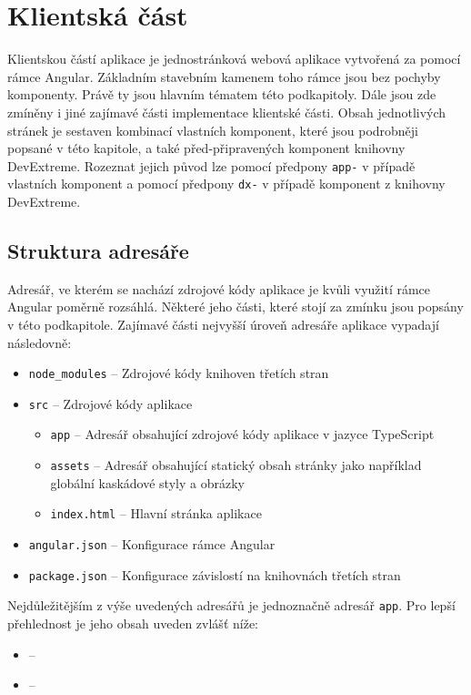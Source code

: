 \section{Klientská část}
Klientskou částí aplikace je jednostránková webová aplikace vytvořená za pomocí rámce Angular. Základním stavebním kamenem toho rámce jsou bez pochyby komponenty. Právě ty jsou hlavním tématem této podkapitoly. Dále jsou zde zmíněny i jiné zajímavé části implementace klientské části. Obsah jednotlivých stránek je sestaven kombinací vlastních komponent, které jsou podrobněji popsané v této kapitole, a také před-připravených komponent knihovny DevExtreme. Rozeznat jejich původ lze pomocí předpony \texttt{app-} v případě vlastních komponent a pomocí předpony \texttt{dx-} v případě komponent z knihovny DevExtreme.


\subsection{Struktura adresáře}
Adresář, ve kterém se nachází zdrojové kódy aplikace je kvůli využití rámce Angular poměrně rozsáhlá. Některé jeho části, které stojí za zmínku jsou popsány v této podkapitole. Zajímavé části nejvyšší úroveň adresáře aplikace vypadají následovně:

\begin{itemize}
  \item \texttt{node\_modules} -- Zdrojové kódy knihoven třetích stran
  \item \texttt{src} -- Zdrojové kódy aplikace
  \begin{itemize}
    \item \texttt{app} -- Adresář obsahující zdrojové kódy aplikace v jazyce TypeScript
     \item \texttt{assets} -- Adresář obsahující statický obsah stránky jako například globální kaskádové styly a obrázky
     \item \texttt{index.html} -- Hlavní stránka aplikace
  \end{itemize}
  \item \texttt{angular.json} -- Konfigurace rámce Angular
  \item \texttt{package.json} -- Konfigurace závislostí na knihovnách třetích stran
\end{itemize}

Nejdůležitějším z výše uvedených adresářů je jednoznačně adresář \texttt{app}. Pro lepší přehlednost je jeho obsah uveden zvlášť níže:

\begin{itemize}
  \item \texttt{} -- 
  \item \texttt{} --
\end{itemize}


